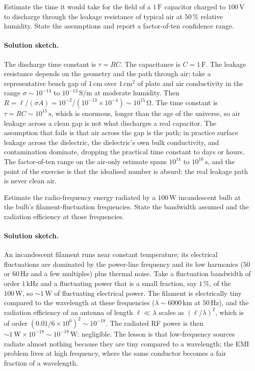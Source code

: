 \begin{exercise}
Estimate the time it would take for the field of a $1\,\si{\farad}$
capacitor charged to $100\,\si{\volt}$ to discharge through the
leakage resistance of typical air at $50\,\%$ relative humidity. State
the assumptions and report a factor-of-ten confidence range.

\paragraph{Solution sketch.} The discharge time constant is $\tau = RC$.
The capacitance is $C = 1\,\si{\farad}$. The leakage resistance depends
on the geometry and the path through air; take a representative bench
gap of $1\,\si{\centi\meter}$ over $1\,\si{\centi\meter\squared}$ of
plate and air conductivity in the range $\sigma \sim 10^{-14}$ to
$10^{-13}\,\si{\siemens\per\meter}$ at moderate humidity. Then $R =
\ell/(\sigma A) = 10^{-2}/(10^{-13}\times 10^{-4}) \sim 10^{15}\,\si{
\ohm}$. The time constant is $\tau = RC \sim 10^{15}\,\si{\second}$,
which is enormous, longer than the age of the universe, so air leakage
across a clean gap is not what discharges a real capacitor. The
assumption that fails is that air across the gap is the path; in
practice surface leakage across the dielectric, the dielectric's own
bulk conductivity, and contamination dominate, dropping the practical
time constant to days or hours. The factor-of-ten range on the air-only
estimate spans $10^{14}$ to $10^{16}\,\si{\second}$, and the point of
the exercise is that the idealised number is absurd: the real leakage
path is never clean air.
\end{exercise}

\begin{exercise}
Estimate the radio-frequency energy radiated by a $100\,\si{\watt}$
incandescent bulb at the bulb's filament-fluctuation frequencies.
State the bandwidth assumed and the radiation efficiency at those
frequencies.

\paragraph{Solution sketch.} An incandescent filament runs near constant
temperature; its electrical fluctuations are dominated by the
power-line frequency and its low harmonics ($50$ or $60\,\si{\hertz}$
and a few multiples) plus thermal noise. Take a fluctuation bandwidth
of order $1\,\si{\kilo\hertz}$ and a fluctuating power that is a small
fraction, say $1\,\%$, of the $100\,\si{\watt}$, so $\sim 1\,\si{\watt}$
of fluctuating electrical power. The filament is electrically tiny
compared to the wavelength at these frequencies ($\lambda \sim
6000\,\si{\kilo\meter}$ at $50\,\si{\hertz}$), and the radiation
efficiency of an antenna of length $\ell \ll \lambda$ scales as
$(\ell/\lambda)^2$, which is of order $(0.01/6\times 10^6)^2 \sim
10^{-18}$. The radiated RF power is then $\sim 1\,\si{\watt}\times
10^{-18} \sim 10^{-18}\,\si{\watt}$: negligible. The lesson is that
low-frequency sources radiate almost nothing because they are tiny
compared to a wavelength; the EMI problem lives at high frequency,
where the same conductor becomes a fair fraction of a wavelength.
\end{exercise}

